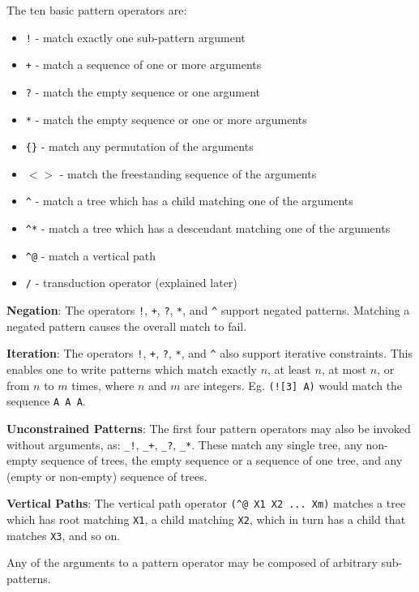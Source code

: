 \documentclass[11pt]{article}
\begin{document}
The ten basic pattern operators are:
\begin {itemize}
\item  \texttt{!}   - match exactly one sub-pattern argument
\item  \texttt{+}   - match a sequence of one or more arguments
\item  \texttt{?}   - match the empty sequence or one argument
\item  \texttt{*}   - match the empty sequence or one or more arguments
\item  \texttt{\{\}}  - match any permutation of the arguments
\item  \texttt{$<>$}  - match the freestanding sequence of the arguments
\item  \texttt{\^}    - match a tree which has a child matching one of the arguments   
\item  \texttt{\^{}*}    - match a tree which has a descendant matching one of the arguments 
\item  \texttt{\^{}@}   - match a vertical path 
\item  \texttt{/}   - transduction operator (explained later)
\end {itemize}

{\bf Negation}: 
The operators \texttt{!}, \texttt{+}, \texttt{?}, \texttt{*}, and \texttt{\^} support negated patterns.  Matching a negated pattern causes the overall match to fail.

{\bf Iteration}:
The operators \texttt{!}, \texttt{+}, \texttt{?}, \texttt{*}, and \texttt{\^} also support iterative constraints.   This enables one to write patterns which match exactly $n$, at least $n$, at most $n$, or from $n$ to $m$ times, where $n$ and $m$ are integers.   Eg. \texttt{(![3] A)} would match the sequence \texttt{A A A}.

{\bf Unconstrained Patterns}:
The first four pattern operators may also be invoked without arguments, as: \texttt{\_!}, \texttt{\_+}, \texttt{\_?}, \texttt{\_*}.  These match any single tree, any non-empty sequence of trees, the empty sequence or a sequence of one tree, and any (empty or non-empty) sequence of trees.   

{\bf Vertical Paths}:
The vertical path operator  \texttt{(\^{}@ X1 X2 ... Xm)}  matches a tree which has root matching \texttt{X1}, a child matching \texttt{X2}, which in turn has a child that matches \texttt{X3}, and so on. 

Any of the arguments to a pattern operator may be composed of arbitrary sub-patterns.   
\end{document}
